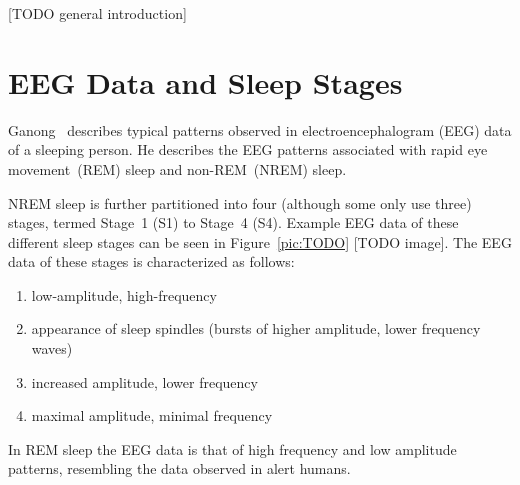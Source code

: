 [TODO general introduction]


\section{EEG Data and Sleep Stages}

Ganong~\cite{Ganong1997} describes typical patterns observed in electroencephalogram (EEG) data of a sleeping person. He describes the EEG patterns associated with rapid eye movement~(REM) sleep and non-REM~(NREM) sleep.

NREM sleep is further partitioned into four (although some only use three) stages, termed Stage~1 (S1) to Stage~4 (S4). Example EEG data of these different sleep stages can be seen in Figure~\ref{pic:TODO} [TODO image]. The EEG data of these stages is characterized as follows:

\begin{enumerate}[label={S\arabic*:}]
	\item low-amplitude, high-frequency
	\item appearance of sleep spindles (bursts of higher amplitude, lower frequency waves)
	\item increased amplitude, lower frequency
	\item maximal amplitude, minimal frequency
\end{enumerate}

In REM sleep the EEG data is that of high frequency and low amplitude patterns, resembling the data observed in alert humans.
